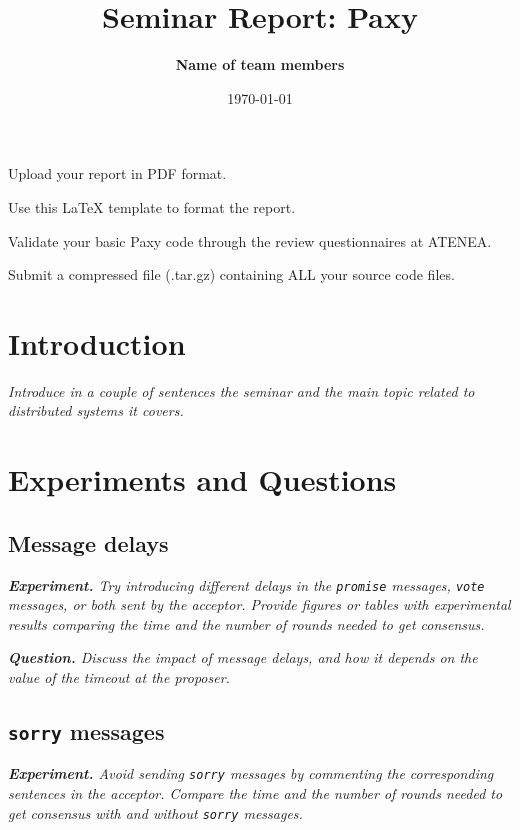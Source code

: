 \documentclass[a4paper, 10pt]{article}
\title{Seminar Report: Paxy}
\author{\textbf{Name of team members}}
\date{\normalsize\today{}}
\begin{document}
\maketitle

\begin{center}
Upload your report in PDF format.
  
Use this LaTeX template to format the report.
  
Validate your basic Paxy code through the review questionnaires at ATENEA.

Submit a compressed file (.tar.gz) containing ALL your source code files.
\end{center}

\section{Introduction}

\textit{Introduce in a couple of sentences the seminar and the main topic related to distributed systems it covers.}

\section{Experiments and Questions}

\subsection{Message delays}

\textit{\textbf{Experiment.} Try introducing different delays in the
\texttt{promise} messages, \texttt{vote} messages, or both sent by the acceptor. Provide figures or tables with experimental results comparing the time and the number of rounds needed to get consensus.}

{\setlength{\parskip}{10pt}\noindent\textit{\textbf{Question.} Discuss the impact of message delays, and how it depends on the value of the timeout at the proposer.}}

\subsection{\texttt{sorry} messages}

\textit{\textbf{Experiment.} Avoid sending \texttt{sorry} messages by commenting the corresponding sentences in the acceptor. Compare the time and the number of rounds needed to get consensus with and without \texttt{sorry} messages.} 
\end{document}
